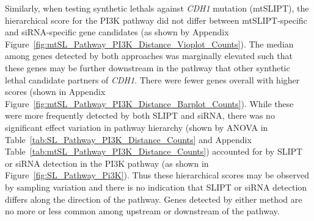 Similarly, when testing \glspl{synthetic lethal} against \textit{CDH1} \gls{mutation} (\acrshort{mtSLIPT}), the hierarchical score for the \gls{PI3K} pathway did not differ between \acrshort{mtSLIPT}-specific and \gls{siRNA}-specific gene candidates (as shown by Appendix Figure~\ref{fig:mtSL_Pathway_PI3K_Distance_Vioplot_Counts}). The median among genes detected by both approaches was marginally elevated such that these genes may be further downstream in the pathway that other \gls{synthetic lethal} candidate partners of \textit{CDH1}. There were fewer genes overall with higher scores (shown in Appendix Figure~\ref{fig:mtSL_Pathway_PI3K_Distance_Barplot_Counts}). While these were more frequently detected by both \gls{SLIPT} and \gls{siRNA}, there was no significant effect variation in pathway hierarchy (shown by \gls{ANOVA} in Table~\ref{tab:SL_Pathway_PI3K_Distance_Counts} and Appendix Table~\ref{tab:mtSL_Pathway_PI3K_Distance_Counts}) accounted for by \gls{SLIPT} or \gls{siRNA} detection in the \gls{PI3K} pathway (as shown in Figure~\ref{fig:SL_Pathway_Pi3K}). Thus these hierarchical scores may be observed by sampling variation and there is no indication that \gls{SLIPT} or \gls{siRNA} detection differs along the direction of the pathway. Genes detected by either method are no more or less common among upstream or downstream of the pathway.




\begin{table*}[!h]
\caption{\acrshort{ANOVA} for synthetic lethality and PI3K hierarchy}
\label{tab:SL_Pathway_PI3K_Distance_Counts}
\noindent{}
\end{table*}

